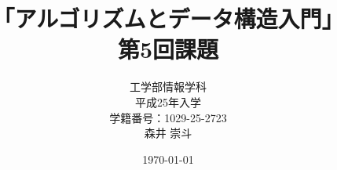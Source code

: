 \documentclass[a4paper,12pt]{article}
\begin{document}
\title{「アルゴリズムとデータ構造入門」\\
第5回課題}
\author{工学部情報学科\\
平成25年入学\\
学籍番号：1029-25-2723\\
森井 崇斗 }
\date{\today}
\maketitle

\lstset{numbers=left,basicstyle=\ttfamily\small,
  commentstyle=\textit, keywordstyle=\bfseries}

\end{document}
